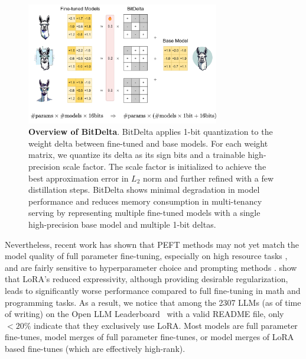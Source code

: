 \documentclass[numbers]{article}
\newcommand{\oursmethod}{BitDelta\xspace}
\begin{document}
\setlength{\belowcaptionskip}{-5pt}
\begin{figure}[ht]
    \centering
    \includegraphics[width=0.75\textwidth]{BitDelta.png}
    \caption{\textbf{Overview of \oursmethod}. \oursmethod applies 1-bit quantization to the weight delta between fine-tuned and base models. For each weight matrix, we quantize its delta as its sign bits and a trainable high-precision scale factor. The scale factor is initialized to achieve the best approximation error in $L_2$ norm and further refined with a few distillation steps. \oursmethod shows minimal degradation in model performance and reduces memory consumption in multi-tenancy serving by representing multiple fine-tuned models with a single high-precision base model and multiple 1-bit deltas.}
    \label{fig:enter-label}

\end{figure}
Nevertheless, recent work has shown that PEFT methods may not yet match the model quality of full parameter fine-tuning, especially on high resource tasks \cite{chen2022revisiting}, and are fairly sensitive to hyperparameter choice and prompting methods \cite{Anyscale2023}. \citet{biderman2024lora} show that LoRA's reduced expressivity, although providing desirable regularization, leads to significantly worse performance compared to full fine-tuning in math and programming tasks. As a result, we notice that among the 2307 LLMs (as of time of writing) on the Open LLM Leaderboard~\citep{open-llm-leaderboard} with a valid README file, only $< 20\%$ indicate that they exclusively use LoRA. Most models are full parameter fine-tunes, model merges \cite{yu2023language,jin2023dataless,wortsman2022model} of full parameter fine-tunes, or model merges of LoRA based fine-tunes (which are effectively high-rank).
\end{document}
